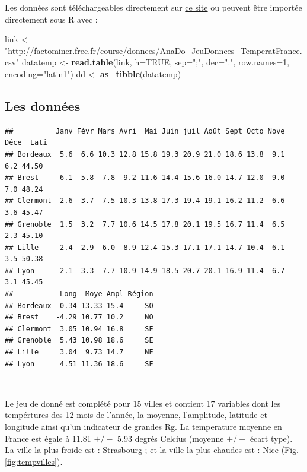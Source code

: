 \documentclass[
]{article}
\newenvironment{Shaded}{\begin{snugshade}}{\end{snugshade}}
\newcommand{\DataTypeTok}[1]{\textcolor[rgb]{0.13,0.29,0.53}{#1}}
\newcommand{\DecValTok}[1]{\textcolor[rgb]{0.00,0.00,0.81}{#1}}
\newcommand{\KeywordTok}[1]{\textcolor[rgb]{0.13,0.29,0.53}{\textbf{#1}}}
\newcommand{\NormalTok}[1]{#1}
\newcommand{\OtherTok}[1]{\textcolor[rgb]{0.56,0.35,0.01}{#1}}
\newcommand{\StringTok}[1]{\textcolor[rgb]{0.31,0.60,0.02}{#1}}
\begin{document}
Les données sont téléchargeables directement sur
\href{https://husson.github.io/data.html}{ce site} ou peuvent être
importée directement sous R avec :

\begin{Shaded}
\begin{Highlighting}[]
\NormalTok{link <-}\StringTok{ "http://factominer.free.fr/course/donnees/AnaDo_JeuDonnees_TemperatFrance.csv"}
\NormalTok{datatemp <-}\StringTok{ }\KeywordTok{read.table}\NormalTok{(link, }\DataTypeTok{h=}\OtherTok{TRUE}\NormalTok{, }\DataTypeTok{sep=}\StringTok{";"}\NormalTok{, }\DataTypeTok{dec=}\StringTok{"."}\NormalTok{, }\DataTypeTok{row.names=}\DecValTok{1}\NormalTok{, }\DataTypeTok{encoding=}\StringTok{"latin1"}\NormalTok{)}
\NormalTok{dd <-}\StringTok{ }\KeywordTok{as_tibble}\NormalTok{(datatemp)}
\end{Highlighting}
\end{Shaded}

\hypertarget{les-donnuxe9es}{%
\subsection{\texorpdfstring{\textbf{Les
données}}{Les données}}\label{les-donnuxe9es}}

\begin{verbatim}
##          Janv Févr Mars Avri  Mai Juin juil Août Sept Octo Nove Déce  Lati
## Bordeaux  5.6  6.6 10.3 12.8 15.8 19.3 20.9 21.0 18.6 13.8  9.1  6.2 44.50
## Brest     6.1  5.8  7.8  9.2 11.6 14.4 15.6 16.0 14.7 12.0  9.0  7.0 48.24
## Clermont  2.6  3.7  7.5 10.3 13.8 17.3 19.4 19.1 16.2 11.2  6.6  3.6 45.47
## Grenoble  1.5  3.2  7.7 10.6 14.5 17.8 20.1 19.5 16.7 11.4  6.5  2.3 45.10
## Lille     2.4  2.9  6.0  8.9 12.4 15.3 17.1 17.1 14.7 10.4  6.1  3.5 50.38
## Lyon      2.1  3.3  7.7 10.9 14.9 18.5 20.7 20.1 16.9 11.4  6.7  3.1 45.45
##           Long  Moye Ampl Région
## Bordeaux -0.34 13.33 15.4     SO
## Brest    -4.29 10.77 10.2     NO
## Clermont  3.05 10.94 16.8     SE
## Grenoble  5.43 10.98 18.6     SE
## Lille     3.04  9.73 14.7     NE
## Lyon      4.51 11.36 18.6     SE
\end{verbatim}

~

Le jeu de donné est complété pour 15 villes et contient 17 variables
dont les tempértures des 12 mois de l'année, la moyenne, l'amplitude,
latitude et longitude ainsi qu'un indicateur de grandes Rg. La
temperature moyenne en France est égale à 11.81 \(+/-\) 5.93 degrés
Celcius (moyenne \(+/-\) écart type). La ville la plus froide est :
Strasbourg ; et la ville la plus chaudes est : Nice (Fig.
\ref{fig:tempvilles}).
\end{document}
